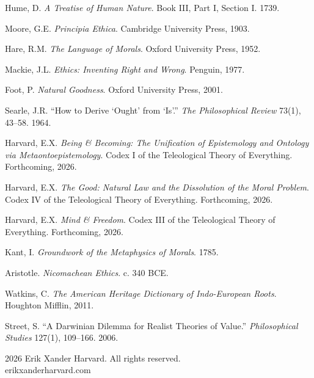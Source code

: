 \documentclass[12pt, letterpaper]{article}
\begin{document}
\begin{enumerate}[label={[\arabic*]}, nosep, leftmargin=2em]

\item Hume, D. \textit{A Treatise of Human Nature}. Book III, Part I, Section I. 1739.

\item Moore, G.E. \textit{Principia Ethica}. Cambridge University Press, 1903.

\item Hare, R.M. \textit{The Language of Morals}. Oxford University Press, 1952.

\item Mackie, J.L. \textit{Ethics: Inventing Right and Wrong}. Penguin, 1977.

\item Foot, P. \textit{Natural Goodness}. Oxford University Press, 2001.

\item Searle, J.R. ``How to Derive `Ought' from `Is'.'' \textit{The Philosophical Review} 73(1), 43--58. 1964.

\item Harvard, E.X. \textit{Being \& Becoming: The Unification of Epistemology and Ontology via Metaontoepistemology}. Codex I of the Teleological Theory of Everything. Forthcoming, 2026.

\item Harvard, E.X. \textit{The Good: Natural Law and the Dissolution of the Moral Problem}. Codex IV of the Teleological Theory of Everything. Forthcoming, 2026.

\item Harvard, E.X. \textit{Mind \& Freedom}. Codex III of the Teleological Theory of Everything. Forthcoming, 2026.

\item Kant, I. \textit{Groundwork of the Metaphysics of Morals}. 1785.

\item Aristotle. \textit{Nicomachean Ethics}. c. 340 BCE.

\item Watkins, C. \textit{The American Heritage Dictionary of Indo-European Roots}. Houghton Mifflin, 2011.

\item Street, S. ``A Darwinian Dilemma for Realist Theories of Value.'' \textit{Philosophical Studies} 127(1), 109--166. 2006.

\end{enumerate}

\vspace{2em}
\begin{center}
{\small \textcopyright{} 2026 Erik Xander Harvard. All rights reserved.\\
erikxanderharvard.com}
\end{center}
\end{document}
